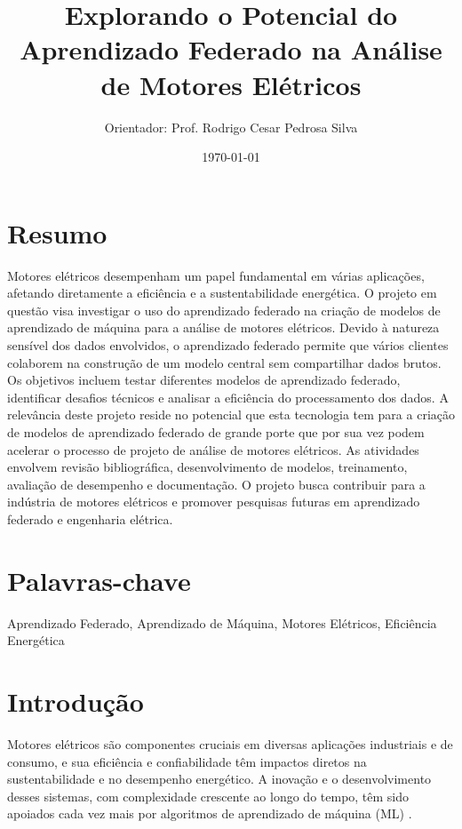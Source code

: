 \documentclass{article}
\title{Explorando o Potencial do Aprendizado Federado na Análise de Motores Elétricos}
\author{Orientador: Prof. Rodrigo Cesar Pedrosa Silva \\
}
\date{\today}
\begin{document}
\maketitle

\section*{Resumo}

Motores elétricos desempenham um papel fundamental em várias aplicações, afetando diretamente a eficiência e a sustentabilidade energética. O projeto em questão visa investigar o uso do aprendizado federado na criação de modelos de aprendizado de máquina para a análise de motores elétricos. Devido à natureza sensível dos dados envolvidos, o aprendizado federado permite que vários clientes colaborem na construção de um modelo central sem compartilhar dados brutos. Os objetivos incluem testar diferentes modelos de aprendizado federado, identificar desafios técnicos e analisar a eficiência do processamento dos dados. A relevância deste projeto reside no potencial que esta tecnologia tem para a criação de modelos de aprendizado federado de grande porte que por sua vez podem acelerar o processo de projeto de análise de motores elétricos. As atividades envolvem revisão bibliográfica, desenvolvimento de modelos, treinamento, avaliação de desempenho e documentação. O projeto busca contribuir para a indústria de motores elétricos e promover pesquisas futuras em aprendizado federado e engenharia elétrica.

\section*{Palavras-chave}

Aprendizado Federado, Aprendizado de Máquina, Motores Elétricos, Eficiência Energética
    
\section{Introdução} 

Motores elétricos são componentes cruciais em diversas aplicações industriais e de consumo, e sua eficiência e confiabilidade têm impactos diretos na sustentabilidade e no desempenho energético. A inovação e o desenvolvimento desses sistemas, com complexidade crescente ao longo do tempo, têm sido apoiados cada vez mais por algoritmos de aprendizado de máquina (ML) \cite{silva2018multiple,khan2019deep,raia2023multiattribute}. 
\end{document}
